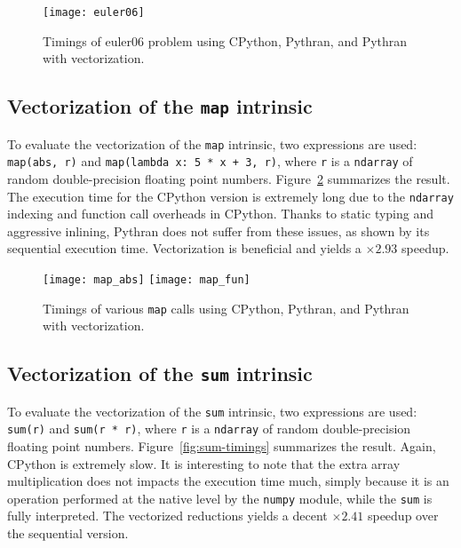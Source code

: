 \documentclass[10pt]{sigplanconf}
\begin{document}
\begin{figure}[ht]

    \texttt{[image: euler06]}
    \caption{Timings of euler06 problem using CPython, Pythran, and Pythran with vectorization.}
    \label{fig:euler06-timings}

\end{figure}

\subsection{Vectorization of the \texttt{map} intrinsic}

To evaluate the vectorization of the \texttt{map} intrinsic, two expressions
are used: \texttt{map(abs, r)} and \texttt{map(lambda x: 5 * x + 3, r)}, where
\texttt{r} is a \texttt{ndarray} of random double-precision floating point
numbers. Figure~\ref{fig:map-timings} summarizes the result. The execution time
for the CPython version is extremely long due to the \texttt{ndarray} indexing and
function call overheads in CPython. Thanks to static typing and aggressive
inlining, Pythran does not suffer from these issues, as shown by its sequential
execution time. Vectorization is beneficial and yields a $\times2.93$ speedup.

\begin{figure}[ht]

    \texttt{[image: map\_abs]}
    \texttt{[image: map\_fun]}
    \caption{Timings of various \texttt{map} calls using CPython, Pythran, and Pythran with vectorization.}
    \label{fig:map-timings}

\end{figure}

\subsection{Vectorization of the \texttt{sum} intrinsic}

To evaluate the vectorization of the \texttt{sum} intrinsic, two expressions
are used: \texttt{sum(r)} and \texttt{sum(r * r)}, where \texttt{r} is a
\texttt{ndarray} of random double-precision floating point numbers.
Figure~\ref{fig:sum-timings} summarizes the result. Again, CPython is extremely
slow. It is interesting to note that the extra array multiplication does not
impacts the execution time much, simply because it is an operation performed at
the native level by the \texttt{numpy} module, while the \texttt{sum} is fully
interpreted. The vectorized reductions yields a decent $\times2.41$ speedup
over the sequential version.
\end{document}
